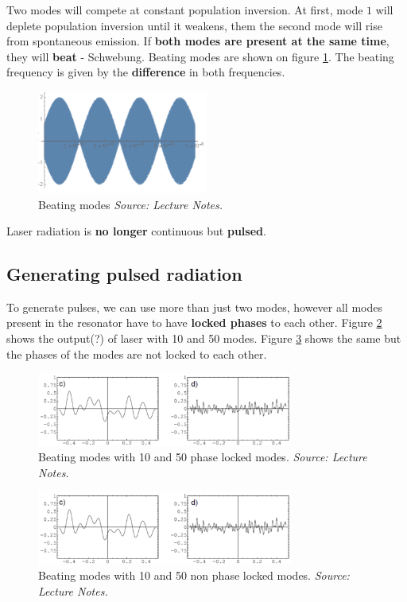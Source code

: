 Two modes will compete at constant population inversion. At first, mode $1$ will deplete population inversion until it weakens, them the second mode will rise from spontaneous emission. 
If \textbf{both modes are present at the same time}, they will \textbf{beat} - Schwebung. Beating modes are shown on figure \ref{fig:schwebung}. The beating frequency is given by the \textbf{difference} in both frequencies. 

\begin{figure}[h!]
    \centering
    \includegraphics[width=0.5\textwidth]{slike/schwebung.png}
    \caption{Beating modes \textit{Source: Lecture Notes.}}
    \label{fig:schwebung}
\end{figure}


Laser radiation is \textbf{no longer} continuous but \textbf{pulsed}.

\subsection{Generating pulsed radiation}
To generate pulses, we can use more than just two modes, however all modes present in the resonator have to have  \textbf{locked phases} to each other.
Figure \ref{fig:mmpl} shows the output(?) of laser with 10 and 50 modes. Figure \ref{fig:mmnpl} shows the same but the phases of the modes are not locked to each other. 

\begin{figure}[h!]
    \centering
    \includegraphics[width=0.75\textwidth]{slike/mmnpl.png}
    \caption{Beating modes with 10 and 50 phase locked modes. \textit{Source: Lecture Notes.}}
    \label{fig:mmpl}
\end{figure}

\begin{figure}[h!]
    \centering
    \includegraphics[width=0.75\textwidth]{slike/mmnpl.png}
    \caption{Beating modes with 10 and 50  non phase locked modes. \textit{Source: Lecture Notes.}}
    \label{fig:mmnpl}
\end{figure}

